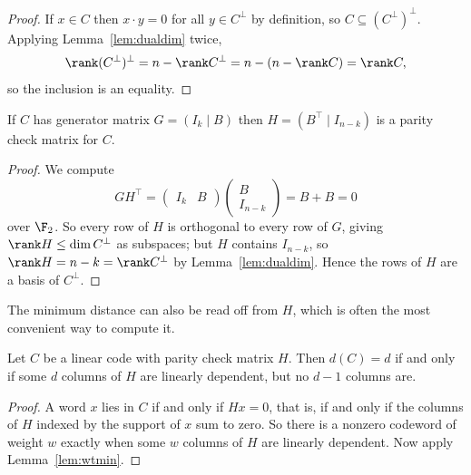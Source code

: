 \begin{proof}
	If $x \in C$ then $x\cdot y = 0$ for all $y \in C^\perp$ by definition, so $C \subseteq (C^\perp)^\perp$. Applying Lemma~\ref{lem:dualdim} twice,
	$$\rank (C^\perp)^\perp = n - \rank C^\perp = n - (n - \rank C) = \rank C,$$
	so the inclusion is an equality.
\end{proof}

\begin{lemma}\label{lem:HfromG}
	If $C$ has generator matrix $G = (I_k \mid B)$ then $H = (B^\top \mid I_{n-k})$ is a parity check matrix for $C$.
\end{lemma}

\begin{proof}
	We compute
	$$GH^\top = \begin{pmatrix} I_k & B\end{pmatrix}\begin{pmatrix} B \\ I_{n-k}\end{pmatrix} = B + B = 0$$
	over $\F_2$. So every row of $H$ is orthogonal to every row of $G$, giving $\rank H \le \dim C^\perp$ as subspaces; but $H$ contains $I_{n-k}$, so $\rank H = n-k = \rank C^\perp$ by Lemma~\ref{lem:dualdim}. Hence the rows of $H$ are a basis of $C^\perp$.
\end{proof}

The minimum distance can also be read off from $H$, which is often the most convenient way to compute it.

\begin{lemma}\label{lem:distH}
	Let $C$ be a linear code with parity check matrix $H$. Then $d(C) = d$ if and only if some $d$ columns of $H$ are linearly dependent, but no $d-1$ columns are.
\end{lemma}

\begin{proof}
	A word $x$ lies in $C$ if and only if $Hx = 0$, that is, if and only if the columns of $H$ indexed by the support of $x$ sum to zero. So there is a nonzero codeword of weight $w$ exactly when some $w$ columns of $H$ are linearly dependent. Now apply Lemma~\ref{lem:wtmin}.
\end{proof}

